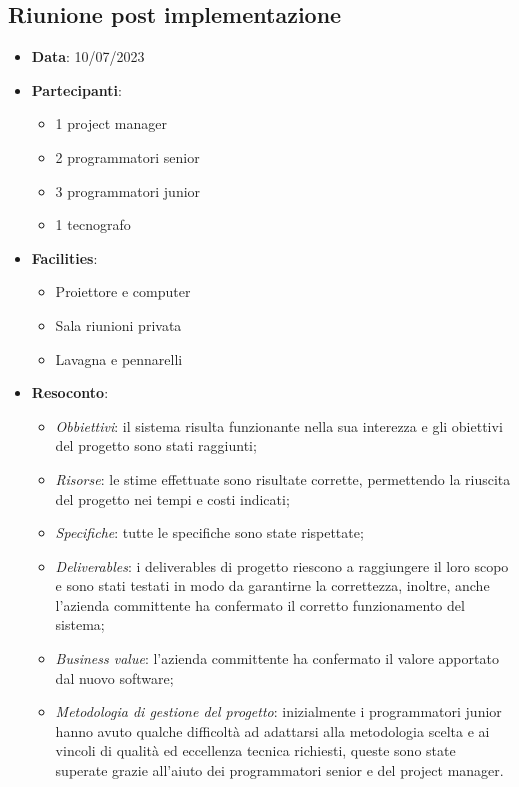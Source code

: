 \documentclass{article}
\begin{document}
  \subsection{Riunione post implementazione}\begin{itemize}
    \item \textbf{Data}: 10/07/2023
    \item \textbf{Partecipanti}: 
    \begin{itemize}
      \item 1 project manager
      \item 2 programmatori senior
      \item 3 programmatori junior
      \item 1 tecnografo
    \end{itemize}
    \item \textbf{Facilities}:
    \begin{itemize}
      \item Proiettore e computer
      \item Sala riunioni privata
      \item Lavagna e pennarelli
    \end{itemize}
    \item \textbf{Resoconto}:
    \begin{itemize}
      \item \emph{Obbiettivi}: 
        il sistema risulta funzionante nella sua interezza e gli obiettivi del progetto sono stati raggiunti;
      \item \emph{Risorse}:
        le stime effettuate sono risultate corrette, permettendo la riuscita del progetto nei tempi e costi indicati;
      \item \emph{Specifiche}:
        tutte le specifiche sono state rispettate;
      \item \emph{Deliverables}:
        i deliverables di progetto riescono a raggiungere il loro scopo e sono stati testati in modo da
        garantirne la correttezza, inoltre, anche l'azienda committente ha confermato il corretto 
        funzionamento del sistema;
      \item \emph{Business value}:
        l'azienda committente ha confermato il valore apportato dal nuovo software;
      \item \emph{Metodologia di gestione del progetto}:
        inizialmente i programmatori junior hanno avuto qualche difficoltà ad adattarsi alla metodologia scelta
        e ai vincoli di qualità ed eccellenza tecnica richiesti, queste sono state superate grazie all'aiuto
        dei programmatori senior e del project manager.
    \end{itemize}
  \end{itemize}
\end{document}
